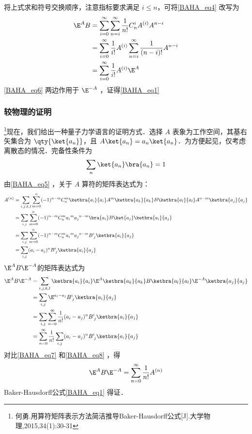 将上式求和符号交换顺序，注意指标要求满足 $i\leq n$，可将\autoref{BAHA_eq4} 改写为
\begin{equation}\label{BAHA_eq6}
\begin{aligned}
\E^A B&=\sum_{i=0}^{\infty}\sum_{n=i}^{\infty}\frac{1}{n!}C_{n}^iA^{(i)}A^{n-i}\\
&=\sum_{i=0}^{\infty}\frac{1}{i!}A^{(i)}\sum_{n=i}^{\infty}\frac{1}{(n-i)!}A^{n-i}\\
&=\sum_{i=0}^{\infty}\frac{1}{i!}A^{(i)}\E^A
\end{aligned}
\end{equation}
\autoref{BAHA_eq6} 两边作用于 $\E^{-A}$ ，证得\autoref{BAHA_eq1} 

\subsubsection{较物理的证明}
\footnote{何勇.用算符矩阵表示方法简洁推导Baker-Hausdorff公式[J].大学物理,2015,34(1):30-31}现在，我们给出一种量子力学语言的证明方式．选择 $A$ 表象为工作空间，其基右矢集合为 $\qty{\ket{a_n}}$，且 $A\ket{a_n}=a_n\ket{a_n}$．为方便起见，仅考虑离散态的情况．完备性条件为
\begin{equation}
\sum_{n}\ket{a_n}\bra{a_n}=1
\end{equation}
由\autoref{BAHA_eq5} ，关于 $A$ 算符的矩阵表达式为：
\begin{equation}\label{BAHA_eq7}
\begin{aligned}
A^{(n)}&=\sum_{i,j,k,l}\sum_{m=0}^{n}(-1)^{n-m}C_{n}^{m}\ketbra{a_i}{a_i}A^m\ketbra{a_k}{a_k}B\ketbra{a_l}{a_l}A^{n-m}\ketbra{a_j}{a_j}\\
&=\sum_{i,j}\sum_{m=0}^{n}(-1)^{n-m}C_n^m{a_i}^m{a_j}^{n-m}\bra{a_i}B\ket{a_j}\ketbra{a_i}{a_j}\\
&=\sum_{i,j}\sum_{m=0}^{n}(-1)^{n-m}C_n^m{a_i}^m{a_j}^{n-m}B^i_{\; j}\ketbra{a_i}{a_j}\\
&=\sum_{i,j}(a_i-a_j)^nB^i_{\; j}\ketbra{a_i}{a_j}
\end{aligned}
\end{equation}
$\E^{A}B\E^{-A}$的矩阵表达式为
\begin{equation}\label{BAHA_eq8}
\begin{aligned}
\E^{A}B\E^{-A}&=\sum_{i,j,k,l}\ketbra{a_i}{a_i}\E^{A}\ketbra{a_k}{a_k}B\ketbra{a_l}{a_l}\E^{-A}\ketbra{a_j}{a_j}\\
&=\sum_{i,j}\E^{a_i-a_j}B^{i}_{\;j}\ketbra{a_i}{a_j}\\
&=\sum_{i,j}\sum_{n=0}^{\infty}\frac{1}{n!}(a_i-a_j)^nB^{i}_{\;j}\ketbra{a_i}{a_j}\\
&=\sum_{n=0}^{\infty}\frac{1}{n!}\sum_{i,j}(a_i-a_j)^nB^{i}_{\;j}\ketbra{a_i}{a_j}
\end{aligned}
\end{equation}
对比\autoref{BAHA_eq7} 和\autoref{BAHA_eq8} ，得
\begin{equation}
\E^{A}B\E^{-A}=\sum_{n=0}^{\infty}\frac{1}{n!}A^{(n)}
\end{equation}
Baker-Hausdorff公式\autoref{BAHA_eq1} 得证．


